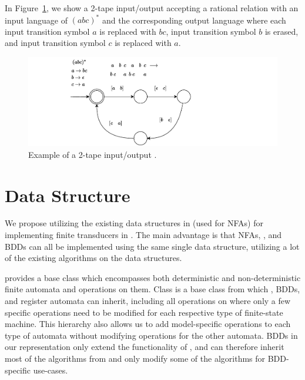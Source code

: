 \begin{example}\label{example:2_tape_nft}
In Figure~\ref{fig:2_tape_nft}, we show a 2-tape input/output \nft accepting a rational relation with an input language of $(abc)^*$ and the corresponding output language where each input transition symbol $a$ is replaced with $bc$, input transition symbol $b$ is erased, and input transition symbol $c$ is replaced with $a$.

\begin{figure}[!ht]
  \centering
  \includegraphics[scale=1.0, keepaspectratio]{obrazky-figures/transducer.drawio.pdf}
  \caption{
    Example of a 2-tape input/output \nft.
  }\label{fig:2_tape_nft}
\end{figure}

\end{example}

\section{Data Structure}
We propose utilizing the existing data structures in \mata (used for NFAs) for implementing finite transducers in \mata.
The main advantage is that NFAs, \nfts, and BDDs can all be implemented using the same single data structure, utilizing a lot of the existing algorithms on the data structures.

\mata provides a base class \nfaClass which encompasses both deterministic and non-deterministic finite automata and operations on them.
Class \nfaClass is a base class from which \nfts, BDDs, and register automata can inherit, including all operations on \nfaClass where only a few specific operations need to be modified for each respective type of finite-state machine.
This hierarchy also allows us to add model-specific operations to each type of automata without modifying operations for the other automata.
BDDs in our representation only extend the functionality of \nfts, and can therefore inherit most of the algorithms from \nfts and only modify some of the algorithms for BDD-specific use-cases.

